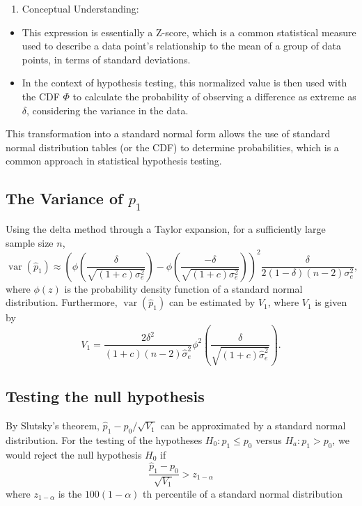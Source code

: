 \documentclass[
  12pt,
  a4paper,
]{article}
\providecommand{\tightlist}{%
  \setlength{\itemsep}{0pt}\setlength{\parskip}{0pt}}
\numberwithin{equation}{section}
\theoremstyle{plain}
\theoremstyle{definition}
\theoremstyle{remark}
\theoremstyle{note}
\begin{document}
\begin{enumerate}
\def\labelenumi{\arabic{enumi}.}
\setcounter{enumi}{3}
\tightlist
\item
  Conceptual Understanding:
\end{enumerate}

\begin{itemize}
\tightlist
\item
  This expression is essentially a Z-score, which is a common
  statistical measure used to describe a data point's relationship to
  the mean of a group of data points, in terms of standard deviations.
\item
  In the context of hypothesis testing, this normalized value is then
  used with the CDF \(\Phi\) to calculate the probability of observing a
  difference as extreme as \(\delta\), considering the variance in the
  data.
\end{itemize}

This transformation into a standard normal form allows the use of
standard normal distribution tables (or the CDF) to determine
probabilities, which is a common approach in statistical hypothesis
testing.

\hypertarget{the-variance-of-p_1}{%
\subsection{\texorpdfstring{The Variance of
\(p_1\)}{The Variance of p\_1}}\label{the-variance-of-p_1}}

Using the delta method through a Taylor expansion, for a sufficiently
large sample size \(n\), \[
\operatorname{var}\left(\hat{p}_1\right) \approx\left(\phi\left(\frac{\delta}{\sqrt{(1+c) \sigma_e^2}}\right)-\phi\left(\frac{-\delta}{\sqrt{(1+c) \sigma_e^2}}\right)\right)^2 \frac{\delta}{2(1-\delta)(n-2) \sigma_e^2},
\] where \(\phi(z)\) is the probability density function of a standard
normal distribution. Furthermore,
\(\operatorname{var}\left(\hat{p}_1\right)\) can be estimated by
\(V_1\), where \(V_1\) is given by \[
V_1=\frac{2 \delta^2}{(1+c)(n-2) \hat{\sigma}_e^2} \phi^2\left(\frac{\delta}{\sqrt{(1+c) \hat{\sigma}_e^2}}\right) .
\]

\hypertarget{testing-the-null-hypothesis}{%
\subsection{Testing the null
hypothesis}\label{testing-the-null-hypothesis}}

By Slutsky's theorem, \(\hat{p}_1-p_0 / \sqrt{V_1}\) can be approximated
by a standard normal distribution. For the testing of the hypotheses
\(H_0: p_1 \leq p_0\) versus \(H_a: p_1>p_0\), we would reject the null
hypothesis \(H_0\) if \[
\frac{\hat{p}_1-p_0}{\sqrt{V_1}}>z_{1-\alpha}
\] where \(z_{1-\alpha}\) is the \(100(1-\alpha)\) th percentile of a
standard normal distribution
\end{document}
